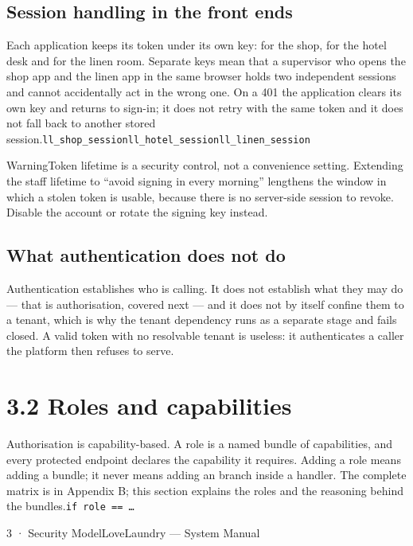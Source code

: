 \documentclass[11pt,a4paper,oneside]{book}
\begin{document}
\subsection*{Session handling in the front ends}
Each application keeps its token under its own key:  for the shop,  for the hotel desk and  for the linen room. Separate keys mean that a supervisor who opens the shop app and the linen app in the same browser holds two independent sessions and cannot accidentally act in the wrong one. On a 401 the application clears its own key and returns to sign-in; it does not retry with the same token and it does not fall back to another stored session.\texttt{ll\_shop\_session}\texttt{ll\_hotel\_session}\texttt{ll\_linen\_session}

\begin{notebox}WarningToken lifetime is a security control, not a convenience setting. Extending the staff lifetime to “avoid signing in every morning” lengthens the window in which a stolen token is usable, because there is no server-side session to revoke. Disable the account or rotate the signing key instead.\end{notebox}
\subsection*{What authentication does not do}
Authentication establishes who is calling. It does not establish what they may do — that is authorisation, covered next — and it does not by itself confine them to a tenant, which is why the tenant dependency runs as a separate stage and fails closed. A valid token with no resolvable tenant is useless: it authenticates a caller the platform then refuses to serve.

\section{3.2 Roles and capabilities}
Authorisation is capability-based. A role is a named bundle of capabilities, and every protected endpoint declares the capability it requires. Adding a role means adding a bundle; it never means adding an  branch inside a handler. The complete matrix is in Appendix B; this section explains the roles and the reasoning behind the bundles.\texttt{if role == …}

3 · Security ModelLoveLaundry — System Manual
\end{document}
